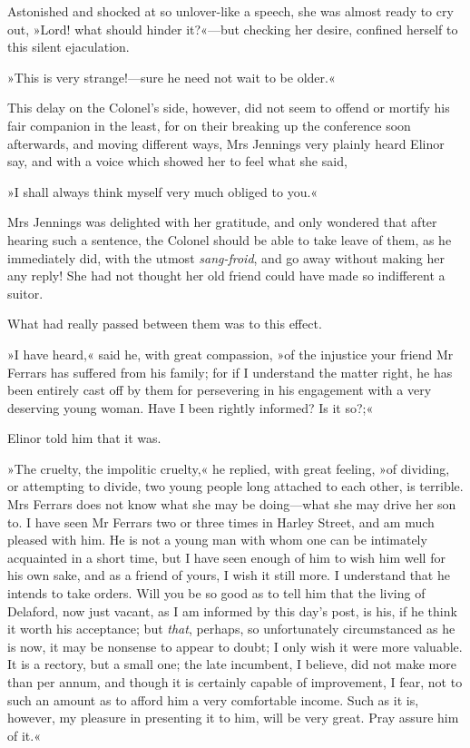 Astonished and shocked at so unlover-like a speech, she was almost ready to cry out, »Lord! what should hinder it?«—but checking her desire, confined herself to this silent ejaculation.

»This is very strange!—sure he need not wait to be older.«

This delay on the Colonel’s side, however, did not seem to offend or mortify his fair companion in the least, for on their breaking up the conference soon afterwards, and moving different ways, Mrs Jennings very plainly heard Elinor say, and with a voice which showed her to feel what she said,

»I shall always think myself very much obliged to you.«

Mrs Jennings was delighted with her gratitude, and only wondered that after hearing such a sentence, the Colonel should be able to take leave of them, as he immediately did, with the utmost \textit{sang-froid}, and go away without making her any reply! She had not thought her old friend could have made so indifferent a suitor.

What had really passed between them was to this effect.

»I have heard,« said he, with great compassion, »of the injustice your friend Mr Ferrars has suffered from his family; for if I understand the matter right, he has been entirely cast off by them for persevering in his engagement with a very deserving young woman. Have I been rightly informed? Is it so?;«

Elinor told him that it was.

»The cruelty, the impolitic cruelty,« he replied, with great feeling, »of dividing, or attempting to divide, two young people long attached to each other, is terrible. Mrs Ferrars does not know what she may be doing—what she may drive her son to. I have seen Mr Ferrars two or three times in Harley Street, and am much pleased with him. He is not a young man with whom one can be intimately acquainted in a short time, but I have seen enough of him to wish him well for his own sake, and as a friend of yours, I wish it still more. I understand that he intends to take orders. Will you be so good as to tell him that the living of Delaford, now just vacant, as I am informed by this day’s post, is his, if he think it worth his acceptance; but \textit{that}, perhaps, so unfortunately circumstanced as he is now, it may be nonsense to appear to doubt; I only wish it were more valuable. It is a rectory, but a small one; the late incumbent, I believe, did not make more than  per annum, and though it is certainly capable of improvement, I fear, not to such an amount as to afford him a very comfortable income. Such as it is, however, my pleasure in presenting it to him, will be very great. Pray assure him of it.«

